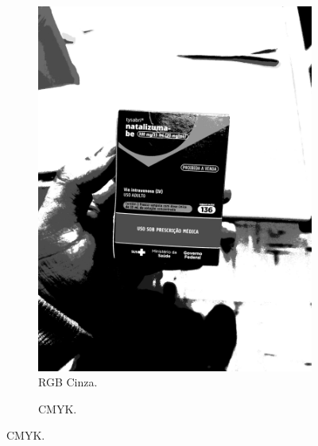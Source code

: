 \begin{figure}[htb]
\begin{subfigure}[b]{0.21\textwidth}
        \caption{RGB Cinza.}
        \label{fig:foto:versoes:2:RGB_Cinza}
        \includegraphics[width=\linewidth]{../pictures/tysabri_rgb_thresh_gray_thresh.jpg}
    \end{subfigure}
    \hfill
    \begin{subfigure}[b]{0.21\textwidth}
        \centering
        \caption{CMYK.}
        \label{fig:foto:versoes:2:CMYK}

\end{subfigure}
\end{figure}
